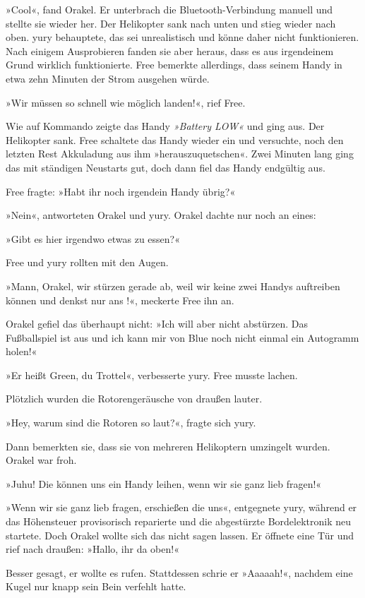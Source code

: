 »Cool«, fand Orakel. Er unterbrach die Bluetooth-Verbindung manuell und stellte sie wieder her. Der Helikopter sank nach unten und stieg wieder nach oben. yury behauptete, das sei unrealistisch und könne daher nicht funktionieren. Nach einigem Ausprobieren fanden sie aber heraus, dass es aus irgendeinem Grund wirklich funktionierte. Free bemerkte allerdings, dass seinem Handy in etwa zehn Minuten der Strom ausgehen würde.

»Wir müssen so schnell wie möglich landen!«, rief Free.

Wie auf Kommando zeigte das Handy \textit{»Battery LOW«} und ging aus. Der Helikopter sank. Free schaltete das Handy wieder ein und versuchte, noch den letzten Rest Akkuladung aus ihm »herauszuquetschen«. Zwei Minuten lang ging das mit ständigen Neustarts gut, doch dann fiel das Handy endgültig aus.

Free fragte: »Habt ihr noch irgendein Handy übrig?«

»Nein«, antworteten Orakel und yury. Orakel dachte nur noch an eines:

»Gibt es hier irgendwo etwas zu essen?«

Free und yury rollten mit den Augen.

»Mann, Orakel, wir stürzen gerade ab, weil wir keine zwei Handys auftreiben können und  denkst nur ans !«, meckerte Free ihn an.

Orakel gefiel das überhaupt nicht: »Ich will aber nicht abstürzen. Das Fußballspiel ist aus und ich kann mir von Blue noch nicht einmal ein Autogramm holen!«

»Er heißt Green, du Trottel«, verbesserte yury. Free musste lachen.

Plötzlich wurden die Rotorengeräusche von draußen lauter.

»Hey, warum sind die Rotoren so laut?«, fragte sich yury.

Dann bemerkten sie, dass sie von mehreren Helikoptern umzingelt wurden. Orakel war froh.

»Juhu! Die können uns ein Handy leihen, wenn wir sie ganz lieb fragen!«

»Wenn wir sie ganz lieb fragen, erschießen die uns«, entgegnete yury, während er das Höhensteuer provisorisch reparierte und die abgestürzte Bordelektronik neu startete. Doch Orakel wollte sich das nicht sagen lassen. Er öffnete eine Tür und rief nach draußen: »Hallo, ihr da oben!«

Besser gesagt, er wollte es rufen. Stattdessen schrie er »Aaaaah!«, nachdem eine Kugel nur knapp sein Bein verfehlt hatte.

